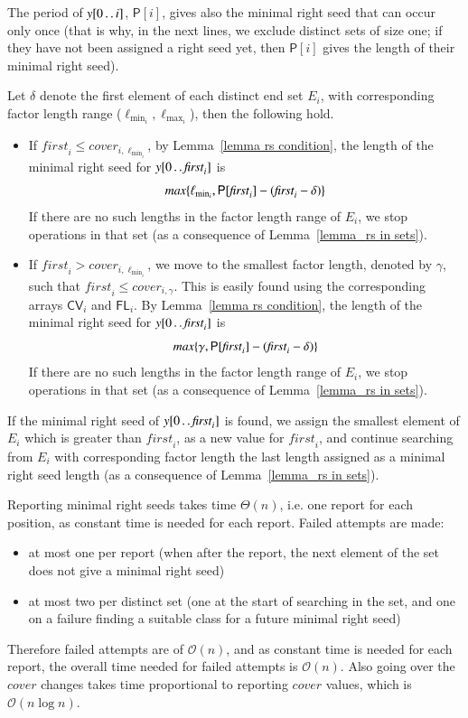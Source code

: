 \documentclass[preprint,12pt]{elsarticle}
\newcommand{\dd}{\mathinner{\ldotp\ldotp}}
\newcommand{\parr}{\textsf{P}}      %
\newcommand{\cv}{\textsf{CV}}
\newcommand{\fl}{\textsf{FL}}
\newcommand{\cO}{\ensuremath{\mathcal{O}}}
\newcommand{\covervalue}{\ensuremath{\mathit{cover}}}
\newcommand{\firstvalue}{\ensuremath{\mathit{first}}}
\begin{document}
The period of $y[0\dd i]$, $\parr[i]$, gives also the minimal right seed that can occur only once (that is why, in the next lines, we 
exclude distinct sets of size one; if they have not been assigned a right seed yet,
then $\parr[i]$ gives the length of their minimal right seed). 

Let $\delta$ denote the first element of each distinct end set $E_{i}$, with corresponding factor 
length range ($\ell_{\min_{i}}, \ell_{\max_{i}}$), then the following hold.

\begin{itemize}
 \item If $\firstvalue_i \leq \covervalue_{i,\ell_{\min_{i}}}$, by Lemma~\ref{lemma rs condition}, 
the length of the minimal right seed for $y[0\dd\firstvalue_i]$ is
\begin{equation}
\emph{max}\{\ell_{\min_{i}}, \parr[\firstvalue_i] - (\firstvalue_i - \delta)\}
\end{equation}
If there are no such lengths in the factor length range of  $E_{i}$, we stop operations in that set (as a consequence of Lemma~\ref{lemma_rs in sets}).

\item If $\firstvalue_i > \covervalue_{i,\ell_{\min_{i}}}$, we move to the smallest factor length, denoted by $\gamma$, such that 
$\firstvalue_i \leq \covervalue_{i,\gamma}$.
This is easily found using the corresponding arrays $\cv_i$ and $\fl_i$. By Lemma~\ref{lemma rs condition}, the length of
the minimal right seed for $y[0\dd\firstvalue_i]$ is
\begin{equation}
\emph{max}\{\gamma, \parr[\firstvalue_i] - (\firstvalue_i - \delta)\}
\end{equation}
If there are no such lengths in the factor length range of  $E_{i}$, we stop operations in that set (as a consequence of Lemma~\ref{lemma_rs in sets}).
\end{itemize}

If the minimal right seed of $y[0\dd\firstvalue_i]$ is found, we assign the smallest element of $E_{i}$ which is greater
than $\firstvalue_i$, as a new value for $\firstvalue_i$, and continue searching from $E_{i}$ with corresponding factor length the last length
assigned as a minimal right seed length (as a consequence of Lemma~\ref{lemma_rs in sets}).

Reporting minimal right seeds takes time $\Theta(n)$, i.e. one report for each position, as constant time is needed for each report.
Failed attempts are made:
\begin{itemize}
  \item at most one per report (when after the report, the next element of the set does not give a minimal right seed)
  \item at most two per distinct set (one at the start of searching in the set, and one on a failure finding a suitable class for a
  future minimal right seed)
\end{itemize}
Therefore failed attempts are of $\cO(n)$, and as constant time is needed for each report, the overall time needed for failed attempts is $\cO(n)$.
Also going over the $\covervalue$ changes takes time proportional to reporting $\covervalue$ values, which is $\cO(n\log n)$.
\end{document}
